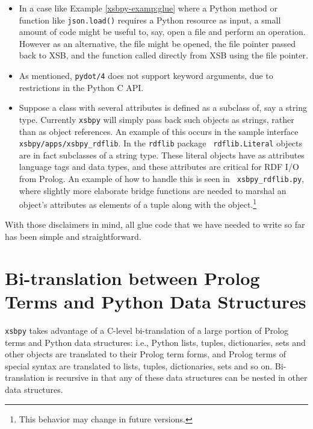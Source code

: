\begin{itemize}
\item In a case like Example \ref{xsbpy-examp:glue} where a Python
  method or function like {\tt json.load()} requires a Python resource
  as input, a small amount of code might be useful to, say, open a
  file and perform an operation.  However as an alternative, the file
  might be opened, the file pointer passed back to XSB, and the
  function called directly from XSB using the file pointer.

  \item As mentioned, {\tt pydot/4} does not support keyword
    arguments, due to restrictions in the Python C API.

  \item Suppose a class with several attributes is defined as a
    subclass of, say a string type.  Currently {\tt xsbpy} will simply
    pass back such objects as strings, rather than as object
    references.  An example of this occurs in the sample interface
    {\tt xsbpy/apps/xsbpy\_rdflib}.  In the {\tt rdflib} package {\tt
      rdflib.Literal} objects are in fact subclasses of a string type.
    These literal objects have as attributes language tags and data
    types, and these attributes are critical for RDF I/O from Prolog.
    An example of how to handle this is seen in {\tt
      xsbpy\_rdflib.py}, where slightly more elaborate bridge
    functions are needed to marshal an object's attributes as elements
    of a tuple along with the object.\footnote{This behavior may
      change in future versions.}
\end{itemize}

With those disclaimers in mind, all glue code that we have needed to
write so far has been simple and straightforward.

\section{Bi-translation between Prolog Terms and Python Data Structures} \label{sec:bi-translation}

{\tt xsbpy} takes advantage of a C-level bi-translation of a large
portion of Prolog terms and Python data structures: i.e., Python
lists, tuples, dictionaries, sets and other objects are translated to
their Prolog term forms, and Prolog terms of special syntax are
translated to lists, tuples, dictionaries, sets and so on.
Bi-translation is recursive in that any of these data structures can
be nested in other data structures.
     
